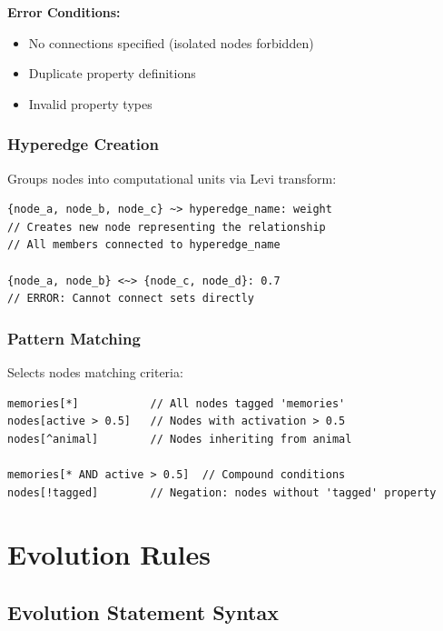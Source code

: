 \documentclass[12pt,a4paper,openany]{book} %
\begin{document}
\textbf{Error Conditions:}
\begin{itemize}
\item No connections specified (isolated nodes forbidden)
\item Duplicate property definitions
\item Invalid property types
\end{itemize}

\subsubsection{Hyperedge Creation}

Groups nodes into computational units via Levi transform:

\vspace{0.5em}
\begin{lstlisting}[language=loom]
{node_a, node_b, node_c} ~> hyperedge_name: weight
// Creates new node representing the relationship
// All members connected to hyperedge_name

{node_a, node_b} <~> {node_c, node_d}: 0.7
// ERROR: Cannot connect sets directly
\end{lstlisting}
\vspace{0.5em}

\subsubsection{Pattern Matching}

Selects nodes matching criteria:

\vspace{0.5em}
\begin{lstlisting}[language=loom]
memories[*]           // All nodes tagged 'memories'
nodes[active > 0.5]   // Nodes with activation > 0.5
nodes[^animal]        // Nodes inheriting from animal

memories[* AND active > 0.5]  // Compound conditions
nodes[!tagged]        // Negation: nodes without 'tagged' property
\end{lstlisting}
\vspace{0.5em}

\section{Evolution Rules}

\subsection{Evolution Statement Syntax}
\end{document}
